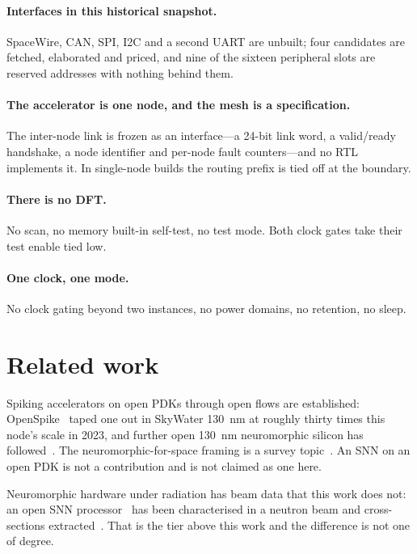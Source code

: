 \documentclass[11pt,a4paper]{article}
\begin{document}
\paragraph{Interfaces in this historical snapshot.} SpaceWire, CAN,
SPI, I2C and a second UART are unbuilt; four candidates are fetched,
elaborated and priced, and nine of the sixteen peripheral slots are
reserved addresses with nothing behind them.

\paragraph{The accelerator is one node, and the mesh is a
specification.} The inter-node link is frozen as an interface---a
\num{24}-bit link word, a valid/ready handshake, a node identifier and
per-node fault counters---and no RTL implements it. In single-node
builds the routing prefix is tied off at the boundary.

\paragraph{There is no DFT.} No scan, no memory built-in self-test, no
test mode. Both clock gates take their test enable tied low.

\paragraph{One clock, one mode.} No clock gating beyond two instances,
no power domains, no retention, no sleep.

\section{Related work}
\label{sec:related}

Spiking accelerators on open PDKs through open flows are established:
OpenSpike~\cite{openspike2023} taped one out in SkyWater
\SI{130}{\nano\meter} at roughly thirty times this node's scale in 2023,
and further open \SI{130}{\nano\meter} neuromorphic silicon has
followed~\cite{kumaresan2026}. The neuromorphic-for-space framing is a
survey topic~\cite{naoukin2023}. An SNN on an
open PDK is not a contribution and is not claimed as one here.

Neuromorphic hardware under radiation has beam data that this work does
not: an open SNN processor~\cite{frenkel2019} has been characterised in a
neutron beam and cross-sections extracted~\cite{nijsink2026}. That is the tier above this work and the
difference is not one of degree.
\end{document}
